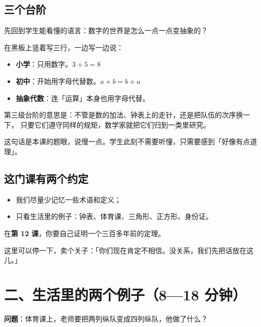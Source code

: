 \subsection*{三个台阶}

先回到学生能看懂的语言：数字的世界是怎么一点一点变抽象的？

在黑板上竖着写三行，一边写一边说：

\begin{itemize}
  \item \textbf{小学}：只用数字。\quad \(3+5=8\)
  \item \textbf{初中}：开始用字母代替数。\quad \(a+b=b+a\)
  \item \textbf{抽象代数}：连「运算」本身也用字母代替。
\end{itemize}

第三级台阶的意思是：不管是数的加法、钟表上的走针，还是把队伍的次序换一下，
只要它们遵守同样的规矩，数学家就把它们归到一类里研究。

\begin{zhu}
  这句话是本课的题眼，说慢一点。学生此刻不需要听懂，只需要感到「好像有点道理」。
\end{zhu}

\subsection*{这门课有两个约定}

\begin{itemize}
  \item 我们尽量少记忆一些术语和定义；
  \item 只看生活里的例子：钟表、体育课、三角形、正方形、身份证。
\end{itemize}

在\textbf{第 12 课}，你要自己证明一个三百多年前的定理。

\begin{caozuo}
  这里可以停一下，卖个关子：「你们现在肯定不相信。没关系，我们先把话放在这儿。」
\end{caozuo}

\section*{二、生活里的两个例子（8—18 分钟）}

\begin{example}
  \textbf{问题}：体育课上，老师要把两列纵队变成四列纵队，他做了什么？
\end{example}

